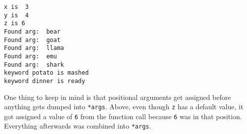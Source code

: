     \begin{Verbatim}[commandchars=\\\{\}]
x is  3
y is  4
z is 6
Found arg:  bear
Found arg:  goat
Found arg:  llama
Found arg:  emu
Found arg:  shark
keyword potato is mashed
keyword dinner is ready
    \end{Verbatim}

    One thing to keep in mind is that positional arguments get assigned
before anything gets dumped into \texttt{*args}. Above, even though
\texttt{z} has a default value, it got assigned a value of \texttt{6}
from the function call because \texttt{6} was in that position.
Everything afterwards was combined into \texttt{*args}.
